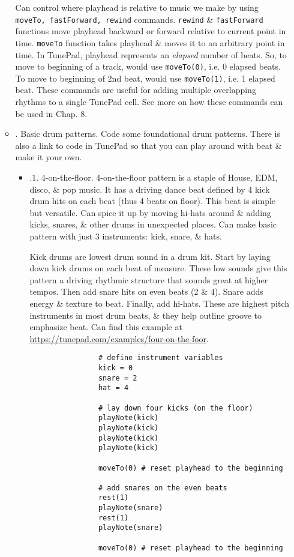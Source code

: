 \documentclass{article}
\begin{document}
\begin{itemize}
\begin{itemize}
		Can control where playhead is relative to music we make by using {\tt moveTo, fastForward, rewind} commands. {\tt rewind} \& {\tt fastForward} functions move playhead backward or forward relative to current point in time. {\tt moveTo} function takes playhead \& moves it to an arbitrary point in time. In TunePad, playhead represents an {\it elapsed} number of beats. So, to move to beginning of a track, would use {\tt moveTo(0)}, i.e. 0 elapsed beats. To move to beginning of 2nd beat, would use {\tt moveTo(1)}, i.e. 1 elapsed beat. These commands are useful for adding multiple overlapping rhythms to a single TunePad cell. See more on how these commands can be used in Chap. 8.
		\item {. Basic drum patterns.} Code some foundational drum patterns. There is also a link to code in TunePad so that you can play around with beat \& make it your own.
		\begin{itemize}
			\item {.1. 4-on-the-floor.} 4-on-the-floor pattern is a staple of House, EDM, disco, \& pop music. It has a driving dance beat defined by 4 kick drum hits on each beat (thus 4 beats on floor). This beat is simple but versatile. Can spice it up by moving hi-hats around \& adding kicks, snares, \& other drums in unexpected places. Can make basic pattern with just 3 instruments: kick, snare, \& hats.
			
			Kick drums are lowest drum sound in a drum kit. Start by laying down kick drums on each beat of measure. These low sounds give this pattern a driving rhythmic structure that sounds great at higher tempos. Then add snare hits on even beats (2 \& 4). Snare adds energy \& texture to beat. Finally, add hi-hats. These are highest pitch instruments in most drum beats, \& they help outline groove to emphasize beat. Can find this example at \url{https://tunepad.com/examples/four-on-the-foor}.
			\begin{verbatim}
				# define instrument variables
				kick = 0
				snare = 2
				hat = 4
				
				# lay down four kicks (on the floor)
				playNote(kick)
				playNote(kick)
				playNote(kick)
				playNote(kick)
				
				moveTo(0) # reset playhead to the beginning
				
				# add snares on the even beats
				rest(1)
				playNote(snare)
				rest(1)
				playNote(snare)
				
				moveTo(0) # reset playhead to the beginning
				

\end{verbatim}
\end{itemize}
\end{itemize}
\end{itemize}
\end{document}
